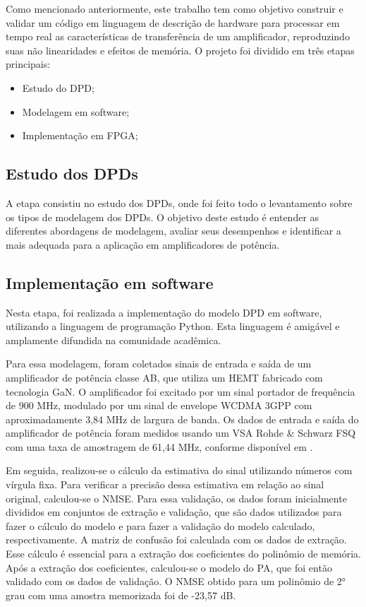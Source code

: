 Como mencionado anteriormente, este trabalho tem como objetivo construir e validar um código em linguagem de descrição de hardware para processar em tempo real as características de transferência de um amplificador, reproduzindo suas não linearidades e efeitos de memória. O projeto foi dividido em três etapas principais:

\begin{itemize}
\item Estudo do DPD;
\item Modelagem em software;
\item Implementação em FPGA;
\end{itemize}



\subsection{Estudo dos DPDs}
A etapa consistiu no estudo dos DPDs, onde foi feito todo o levantamento sobre os tipos de modelagem dos DPDs. O objetivo deste estudo é entender as diferentes abordagens de modelagem, avaliar seus desempenhos e identificar a mais adequada para a aplicação em amplificadores de potência.

\subsection{Implementação em software} \label{sec:implsoft}

Nesta etapa, foi realizada a implementação do modelo DPD em software, utilizando a linguagem de programação Python. Esta linguagem é amigável e amplamente difundida na comunidade acadêmica.

Para essa modelagem, foram coletados sinais de entrada e saída de um amplificador de potência classe AB, que utiliza um HEMT fabricado com tecnologia GaN. O amplificador foi excitado por um sinal portador de frequência de 900 MHz, modulado por um sinal de envelope WCDMA 3GPP com aproximadamente 3,84 MHz de largura de banda. Os dados de entrada e saída do amplificador de potência foram medidos usando um VSA Rohde \& Schwarz FSQ com uma taxa de amostragem de 61,44 MHz, conforme disponível em \cite{Bonfim2016}.

Em seguida, realizou-se o cálculo da estimativa do sinal utilizando números com vírgula fixa. Para verificar a precisão dessa estimativa em relação ao sinal original, calculou-se o NMSE. Para essa validação, os dados foram inicialmente divididos em conjuntos de extração e validação, que são dados utilizados para fazer o cálculo do modelo e para fazer a validação do modelo calculado, respectivamente. A matriz de confusão foi calculada com os dados de extração. Esse cálculo é essencial para a extração dos coeficientes do polinômio de memória. Após a extração dos coeficientes, calculou-se o modelo do PA, que foi então validado com os dados de validação. O NMSE obtido para um polinômio de 2° grau com uma amostra memorizada foi de -23,57 dB.

